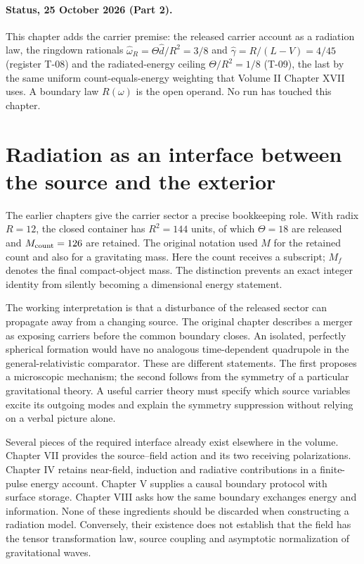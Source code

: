 

\paragraph*{Status, 25 October 2026 (Part 2).} This chapter adds the carrier premise: the released carrier account as a radiation law, the ringdown rationals $\hat\omega_R=\Theta\hat d/R^2=3/8$ and $\hat\gamma=R/(L-V)=4/45$ (register T-08) and the radiated-energy ceiling $\Theta/R^2=1/8$ (T-09), the last by the same uniform count-equals-energy weighting that Volume II Chapter XVII uses. A boundary law $R(\omega)$ is the open operand. No run has touched this chapter.


\section{Radiation as an interface between the source and the exterior}
The earlier chapters give the carrier sector a precise bookkeeping role. With radix $R=12$, the closed container has $R^2=144$ units, of which $\Theta=18$ are released and $M_{\rm count}=126$ are retained. The original notation used $M$ for the retained count and also for a gravitating mass. Here the count receives a subscript; $M_f$ denotes the final compact-object mass. The distinction prevents an exact integer identity from silently becoming a dimensional energy statement.

The working interpretation is that a disturbance of the released sector can propagate away from a changing source. The original chapter describes a merger as exposing carriers before the common boundary closes. An isolated, perfectly spherical formation would have no analogous time-dependent quadrupole in the general-relativistic comparator. These are different statements. The first proposes a microscopic mechanism; the second follows from the symmetry of a particular gravitational theory. A useful carrier theory must specify which source variables excite its outgoing modes and explain the symmetry suppression without relying on a verbal picture alone.

Several pieces of the required interface already exist elsewhere in the volume. Chapter VII provides the source--field action and its two receiving polarizations. Chapter IV retains near-field, induction and radiative contributions in a finite-pulse energy account. Chapter V supplies a causal boundary protocol with surface storage. Chapter VIII asks how the same boundary exchanges energy and information. None of these ingredients should be discarded when constructing a radiation model. Conversely, their existence does not establish that the field has the tensor transformation law, source coupling and asymptotic normalization of gravitational waves.

